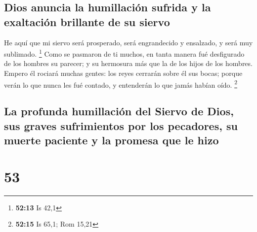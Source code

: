 \hypertarget{dios-anuncia-la-humillaciuxf3n-sufrida-y-la-exaltaciuxf3n-brillante-de-su-siervo}{%
\subsection{Dios anuncia la humillación sufrida y la exaltación
brillante de su
siervo}\label{dios-anuncia-la-humillaciuxf3n-sufrida-y-la-exaltaciuxf3n-brillante-de-su-siervo}}

 He aquí que mi siervo será prosperado, será engrandecido
y ensalzado, y será muy sublimado. \footnote{\textbf{52:13} Is 42,1}
 Como se pasmaron de ti muchos, en tanta manera fué
desfigurado de los hombres su parecer; y su hermosura más que la de los
hijos de los hombres.  Empero él rociará muchas gentes:
los reyes cerrarán sobre él sus bocas; porque verán lo que nunca les fué
contado, y entenderán lo que jamás habían oído. \footnote{\textbf{52:15}
  Is 65,1; Rom 15,21}

\hypertarget{la-profunda-humillaciuxf3n-del-siervo-de-dios-sus-graves-sufrimientos-por-los-pecadores-su-muerte-paciente-y-la-promesa-que-le-hizo}{%
\subsection{La profunda humillación del Siervo de Dios, sus graves
sufrimientos por los pecadores, su muerte paciente y la promesa que le
hizo}\label{la-profunda-humillaciuxf3n-del-siervo-de-dios-sus-graves-sufrimientos-por-los-pecadores-su-muerte-paciente-y-la-promesa-que-le-hizo}}

\hypertarget{section-52}{%
\section{53}\label{section-52}}

